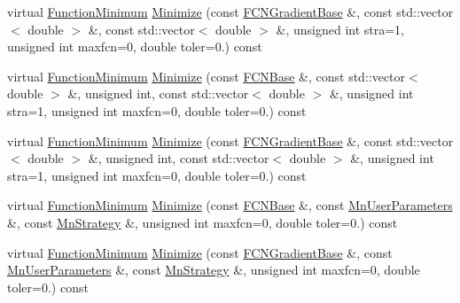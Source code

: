 \begin{DoxyCompactItemize}
\item 
virtual \mbox{\hyperlink{classROOT_1_1Minuit2_1_1FunctionMinimum}{Function\+Minimum}} \mbox{\hyperlink{classROOT_1_1Minuit2_1_1ModularFunctionMinimizer_a8354ed4403dda68040ea4d1b174835c1}{Minimize}} (const \mbox{\hyperlink{classROOT_1_1Minuit2_1_1FCNGradientBase}{F\+C\+N\+Gradient\+Base}} \&, const std\+::vector$<$ double $>$ \&, const std\+::vector$<$ double $>$ \&, unsigned int stra=1, unsigned int maxfcn=0, double toler=0.) const
\item 
virtual \mbox{\hyperlink{classROOT_1_1Minuit2_1_1FunctionMinimum}{Function\+Minimum}} \mbox{\hyperlink{classROOT_1_1Minuit2_1_1ModularFunctionMinimizer_ab9a4f3d9f93071d0363ad838c103690d}{Minimize}} (const \mbox{\hyperlink{classROOT_1_1Minuit2_1_1FCNBase}{F\+C\+N\+Base}} \&, const std\+::vector$<$ double $>$ \&, unsigned int, const std\+::vector$<$ double $>$ \&, unsigned int stra=1, unsigned int maxfcn=0, double toler=0.) const
\item 
virtual \mbox{\hyperlink{classROOT_1_1Minuit2_1_1FunctionMinimum}{Function\+Minimum}} \mbox{\hyperlink{classROOT_1_1Minuit2_1_1ModularFunctionMinimizer_a97334cf66537c195aa8d6df14e745bef}{Minimize}} (const \mbox{\hyperlink{classROOT_1_1Minuit2_1_1FCNGradientBase}{F\+C\+N\+Gradient\+Base}} \&, const std\+::vector$<$ double $>$ \&, unsigned int, const std\+::vector$<$ double $>$ \&, unsigned int stra=1, unsigned int maxfcn=0, double toler=0.) const
\item 
virtual \mbox{\hyperlink{classROOT_1_1Minuit2_1_1FunctionMinimum}{Function\+Minimum}} \mbox{\hyperlink{classROOT_1_1Minuit2_1_1ModularFunctionMinimizer_a194ce8da431014aa6a2b45ede2a53391}{Minimize}} (const \mbox{\hyperlink{classROOT_1_1Minuit2_1_1FCNBase}{F\+C\+N\+Base}} \&, const \mbox{\hyperlink{classROOT_1_1Minuit2_1_1MnUserParameters}{Mn\+User\+Parameters}} \&, const \mbox{\hyperlink{classROOT_1_1Minuit2_1_1MnStrategy}{Mn\+Strategy}} \&, unsigned int maxfcn=0, double toler=0.) const
\item 
virtual \mbox{\hyperlink{classROOT_1_1Minuit2_1_1FunctionMinimum}{Function\+Minimum}} \mbox{\hyperlink{classROOT_1_1Minuit2_1_1ModularFunctionMinimizer_a71fd7fab341881d9d082d4d2d5f5ed2d}{Minimize}} (const \mbox{\hyperlink{classROOT_1_1Minuit2_1_1FCNGradientBase}{F\+C\+N\+Gradient\+Base}} \&, const \mbox{\hyperlink{classROOT_1_1Minuit2_1_1MnUserParameters}{Mn\+User\+Parameters}} \&, const \mbox{\hyperlink{classROOT_1_1Minuit2_1_1MnStrategy}{Mn\+Strategy}} \&, unsigned int maxfcn=0, double toler=0.) const
\item 

\end{DoxyCompactItemize}

